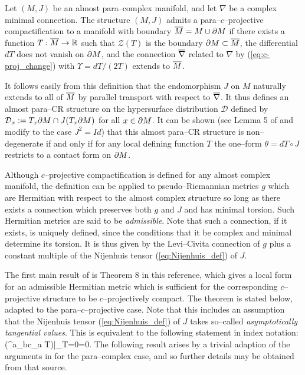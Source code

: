 \begin{defi}
\label{defi_1}  Let $(M,J)$ be an almost para--complex manifold, and let $\nabla$ be a complex minimal connection. The structure $(M,J)$ admits a para--$c$--projective compactification to a manifold with boundary $\overline{M}=M\cup\partial M$
if there exists a function $T:\overline{M}\rightarrow \mathbb{R}$ such that $\mathcal{Z}(T)$ is the boundary
$\partial M\subset \overline{M}$, the differential $dT$ does not vanish on $\partial M$, and the connection $\overline{\nabla}$ related to $\nabla$ by (\ref{eq:c-proj_change}) with $\Upsilon = dT/(2T)$ extends to $\overline{M}$.
\end{defi}



It follows easily from this definition that the endomorphism $J$ on $M$ naturally extends to all of $\overline{M}$ by parallel transport with respect to $\overline{\nabla}$. It thus defines an almost para--CR structure on the hypersurface distribution $\mathcal{D}$ defined by $\mathcal{D}_x:=T_x\partial M \cap J(T_x \partial M)$ for all $x\in\partial M$. It can be shown (see Lemma 5 of \cite{CG} and modify to the case $J^2=Id$) that this almost para--CR structure is non--degenerate if and only if for any local defining function $T$ the one--form $\theta=dT\circ J$ restricts to a contact form on $\partial M$.


Although $c$--projective compactification is defined for any almost complex manifold, the definition can be applied to pseudo--Riemannian metrics $g$ which are Hermitian with respect to the almost complex structure so long as there exists a connection which preserves both $g$ and $J$ and has minimal torsion. Such Hermitian metrics are said to be \textit{admissible}.  Note that such a connection, if it exists, is uniquely defined, since the conditions that it be complex and minimal determine its torsion. It is thus given by the Levi--Civita connection of $g$ plus a constant multiple of the Nijenhuis tensor (\ref{eq:Nijenhuis_def}) of $J$.

The first main result of \cite{CG} is  Theorem 8 in this reference, which gives a local form for an admissible Hermitian metric which is sufficient for the corresponding $c$--projective structure to be $c$--projectively compact. The theorem is stated below, adapted to the para--$c$--projective case. Note that this includes an assumption that the Nijenhuis tensor (\ref{eq:Nijenhuis_def}) of $J$ takes so--called \textit{asymptotically tangential values}. This is equivalent to the following statement in index notation:
\be
\label{Nijenhuis_condition}
\Big({^{a}}_{bc}\nabla_a T\Big)\Big|_{T=0}=0.  \ee
The
following result arises by a trivial adaption of the arguments in
\cite{CG} for the para--complex case, and so further details may be obtained from that source.

